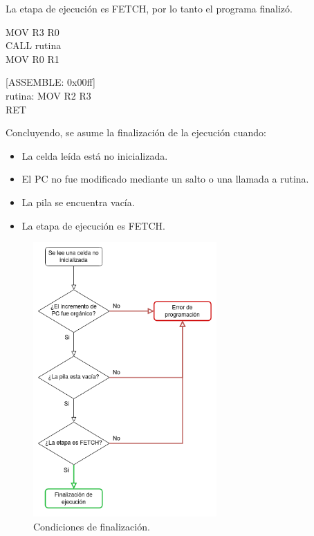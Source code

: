 \begin{itemize}
  La etapa de ejecución es FETCH, por lo tanto el programa finalizó.
  \begin{center}
    MOV R3 R0 \\
    CALL rutina \\
    MOV R0 R1 \\
  \end{center}
  \begin{center}
    [ASSEMBLE: 0x00ff] \\
    rutina: MOV R2 R3 \\
    RET
  \end{center}
\end{itemize}

\begin{samepage}
  Concluyendo, se asume la finalización de la ejecución cuando:
  \begin{itemize}
    \item La celda leída está no inicializada.
    \item El PC no fue modificado mediante un salto o una llamada a rutina.
    \item La pila se encuentra vacía.
    \item La etapa de ejecución es FETCH.
  \end{itemize}
\end{samepage}

\begin{figure}[H]
  \centering
  \includegraphics[width=7cm]{figuras/condicion_finalizacion.png}
  \caption{Condiciones de finalización.}
\end{figure}
\label{subsec:condfin}

